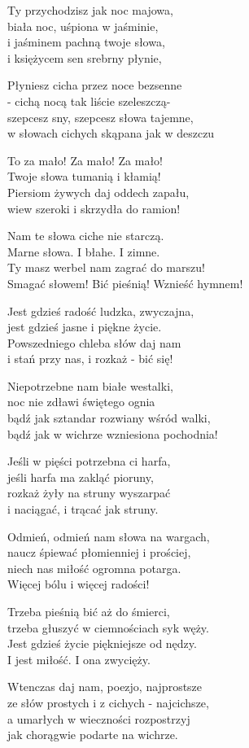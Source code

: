 \begin{text}
    \hfill\break
    Ty przychodzisz jak noc majowa,\\
    biała noc, uśpiona w jaśminie,\\
    i jaśminem pachną twoje słowa,\\
    i księżycem sen srebrny płynie,

    Płyniesz cicha przez noce bezsenne\\
    - cichą nocą tak liście szeleszczą-\\
    szepcesz sny, szepcesz słowa tajemne,\\
    w słowach cichych skąpana jak w deszczu
    
    To za mało! Za mało! Za mało!\\
    Twoje słowa tumanią i kłamią!\\
    Piersiom żywych daj oddech zapału,\\
    wiew szeroki i skrzydła do ramion!
    
    Nam te słowa ciche nie starczą.\\
    Marne słowa. I błahe. I zimne.\\
    Ty masz werbel nam zagrać do marszu!\\
    Smagać słowem! Bić pieśnią! Wznieść hymnem!
    
    Jest gdzieś radość ludzka, zwyczajna,\\
    jest gdzieś jasne i piękne życie.\\
    Powszedniego chleba słów daj nam\\
    i stań przy nas, i rozkaż - bić się!
    
    Niepotrzebne nam białe westalki,\\
    noc nie zdławi świętego ognia\\
    bądź jak sztandar rozwiany wśród walki,\\
    bądź jak w wichrze wzniesiona pochodnia!
    
    Jeśli w pięści potrzebna ci harfa,\\
    jeśli harfa ma zakląć pioruny,\\
    rozkaż żyły na struny wyszarpać\\
    i naciągać, i trącać jak struny.

    Odmień, odmień nam słowa na wargach,\\
    naucz śpiewać płomienniej i prościej,\\
    niech nas miłość ogromna potarga.\\
    Więcej bólu i więcej radości!

    Trzeba pieśnią bić aż do śmierci,\\
    trzeba głuszyć w ciemnościach syk węży.\\
    Jest gdzieś życie piękniejsze od nędzy.\\
    I jest miłość. I ona zwycięży.
    
    Wtenczas daj nam, poezjo, najprostsze\\
    ze słów prostych i z cichych - najcichsze,\\
    a umarłych w wieczności rozpostrzyj\\
    jak chorągwie podarte na wichrze.
\end{text}
